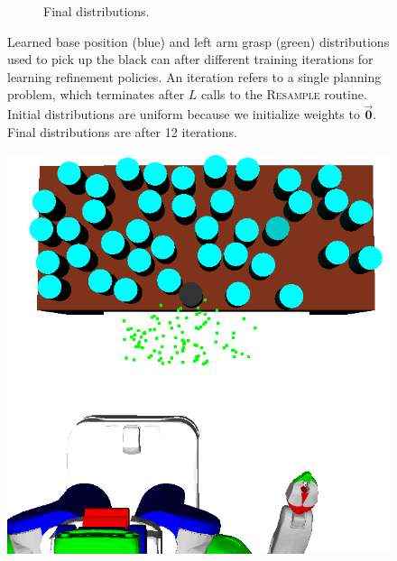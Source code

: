 \begin{figure}[t]
\begin{subfigure}[b]{0.35\linewidth}
    \caption{Final distributions.}
  \end{subfigure}
  \caption{\small{Learned base position (blue) and left arm grasp (green) distributions used to
pick up the black can after different training iterations for learning refinement policies.
An iteration refers to a single planning problem,
which terminates after $L$ calls to the \textsc{Resample} routine.
Initial distributions are uniform because we initialize weights to $\vec{\mathbf{0}}$.
Final distributions are after 12 iterations.}}
  \label{fig:training}
\end{figure}

\begin{figure}[t]
  \centering
    \noindent
    \includegraphics[scale=0.15]{images/grasp_context_left.png}\hspace{6mm}

\end{figure}
